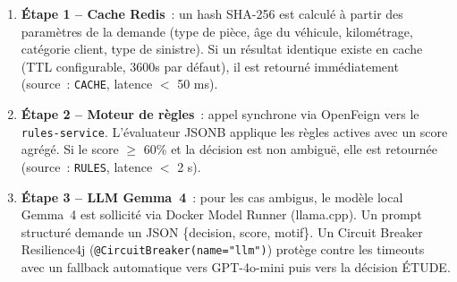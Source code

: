 \begin{enumerate}
    \item \textbf{\'{E}tape 1 -- Cache Redis}~: un hash SHA-256 est calcul\'{e} \`{a} partir des param\`{e}tres de la demande (type de pi\`{e}ce, \^{a}ge du v\'{e}hicule, kilom\'{e}trage, cat\'{e}gorie client, type de sinistre). Si un r\'{e}sultat identique existe en cache (TTL configurable, 3600s par d\'{e}faut), il est retourn\'{e} imm\'{e}diatement (source~: \texttt{CACHE}, latence $<$ 50 ms).
    \item \textbf{\'{E}tape 2 -- Moteur de r\`{e}gles}~: appel synchrone via OpenFeign vers le \texttt{rules-service}. L'\'{e}valuateur JSONB applique les r\`{e}gles actives avec un score agr\'{e}g\'{e}. Si le score $\geq$ 60\% et la d\'{e}cision est non ambigu\"{e}, elle est retourn\'{e}e (source~: \texttt{RULES}, latence $<$ 2 s).
    \item \textbf{\'{E}tape 3 -- LLM Gemma~4}~: pour les cas ambigus, le mod\`{e}le local Gemma~4 est sollicit\'{e} via Docker Model Runner (llama.cpp). Un prompt structur\'{e} demande un JSON \{decision, score, motif\}. Un Circuit Breaker Resilience4j (\texttt{@CircuitBreaker(name="llm")}) prot\`{e}ge contre les timeouts avec un fallback automatique vers GPT-4o-mini puis vers la d\'{e}cision \'{E}TUDE.
\end{enumerate}

